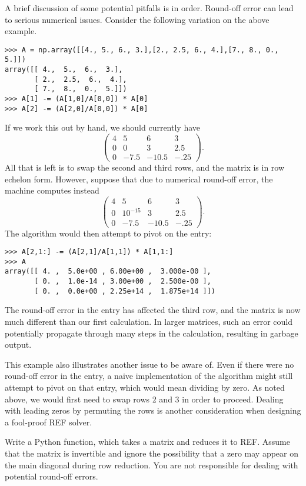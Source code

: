 A brief discussion of some potential pitfalls is in order. 
Round-off error can lead to serious numerical issues. Consider the 
following variation on the above example. 
\begin{lstlisting}
>>> A = np.array([[4., 5., 6., 3.],[2., 2.5, 6., 4.],[7., 8., 0., 5.]])
array([[ 4.,  5.,  6.,  3.],
       [ 2.,  2.5,  6.,  4.],
       [ 7.,  8.,  0.,  5.]])
>>> A[1] -= (A[1,0]/A[0,0]) * A[0]
>>> A[2] -= (A[2,0]/A[0,0]) * A[0]
\end{lstlisting}
If we work this out by hand, we should currently have
\[
\begin{pmatrix}
4&5&6&3 \\
0&0&3&2.5 \\
0&-7.5&-10.5&-.25
\end{pmatrix}.
\]
All that is left is to swap the second and third rows, and the matrix is in 
row echelon form. However, suppose that due to numerical round-off error, 
the machine computes instead 
\[
\begin{pmatrix}
4&5&6&3 \\
0&10^{-15}&3&2.5 \\
0&-7.5&-10.5&-.25
\end{pmatrix}.
\]
The algorithm would then attempt to pivot on the  entry:
\begin{lstlisting}
>>> A[2,1:] -= (A[2,1]/A[1,1]) * A[1,1:]
>>> A
array([[ 4. ,  5.0e+00 , 6.00e+00 ,  3.000e-00 ],
       [ 0. ,  1.0e-14 , 3.00e+00 ,  2.500e-00 ],
       [ 0. ,  0.0e+00 , 2.25e+14 ,  1.875e+14 ]])
\end{lstlisting}
The round-off error in the  entry has affected the third
row, and the matrix is now much different than our first calculation. In 
larger matrices, such an error could potentially propagate through many 
steps in the calculation, resulting in garbage output.

This example also illustrates another issue to be aware of. Even if there 
were no round-off error in the  entry, a naive implementation of 
the algorithm might still attempt to pivot on that entry, which would mean 
dividing by zero. As noted above, we would first need to swap rows 2 and 3 
in order to proceed. Dealing with leading zeros by permuting the rows is 
another consideration when designing a fool-proof REF solver. 

\begin{problem}
\label{prob:REF}
Write a Python function, which takes a matrix and reduces it to REF.
Assume that the matrix is invertible and ignore the possibility that a zero may appear on the main diagonal during row reduction. You are not 
responsible for dealing with potential round-off errors. 
\end{problem}

